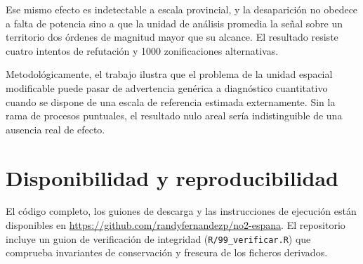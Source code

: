\documentclass[10pt,twocolumn,a4paper]{article}
\begin{document}
Ese mismo efecto es indetectable a escala provincial, y la desaparición no
obedece a falta de potencia sino a que la unidad de análisis promedia la señal
sobre un territorio dos órdenes de magnitud mayor que su alcance. El
resultado resiste cuatro intentos de refutación y \num{1000} zonificaciones
alternativas.

Metodológicamente, el trabajo ilustra que el problema de la unidad espacial
modificable puede pasar de advertencia genérica a diagnóstico cuantitativo
cuando se dispone de una escala de referencia estimada externamente. Sin la
rama de procesos puntuales, el resultado nulo areal sería indistinguible de
una ausencia real de efecto.

\section*{Disponibilidad y reproducibilidad}

El código completo, los guiones de descarga y las instrucciones de ejecución
están disponibles en \url{https://github.com/randyfernandezp/no2-espana}. El
repositorio incluye un guion de verificación de integridad
(\texttt{R/99\_verificar.R}) que comprueba invariantes de conservación y
frescura de los ficheros derivados.


\end{document}
